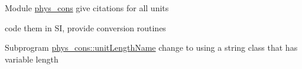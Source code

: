 \label{todo__todo000001}
\hypertarget{todo__todo000001}{}
 
\begin{DoxyDescription}
\item[Module \hyperlink{namespacephys__cons}{phys\_\-cons} ]give citations for all units 

code them in SI, provide conversion routines 
\end{DoxyDescription}

\label{todo__todo000002}
\hypertarget{todo__todo000002}{}
 
\begin{DoxyDescription}
\item[Subprogram \hyperlink{namespacephys__cons_a54d8616222c422eac2f4ae16a5c3bcba}{phys\_\-cons::unitLengthName} ]change to using a string class that has variable length 
\end{DoxyDescription}